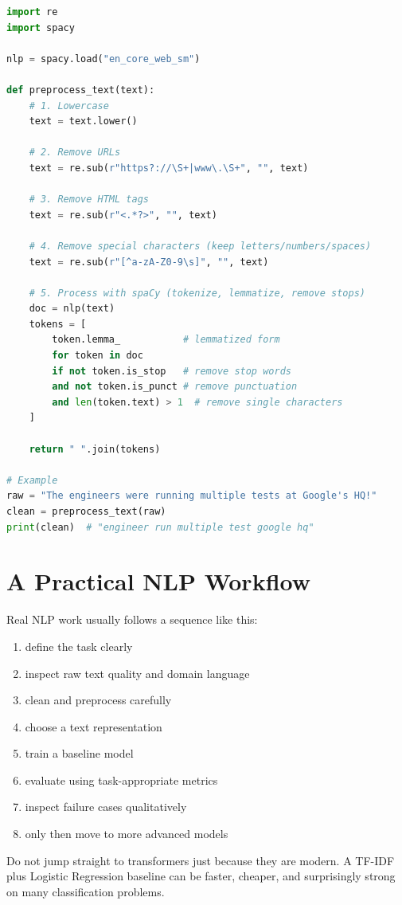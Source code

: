 \documentclass[12pt, a4paper, oneside]{book}
\begin{document}
\begin{lstlisting}[language=Python, caption={Complete NLP preprocessing pipeline}]
import re
import spacy

nlp = spacy.load("en_core_web_sm")

def preprocess_text(text):
    # 1. Lowercase
    text = text.lower()

    # 2. Remove URLs
    text = re.sub(r"https?://\S+|www\.\S+", "", text)

    # 3. Remove HTML tags
    text = re.sub(r"<.*?>", "", text)

    # 4. Remove special characters (keep letters/numbers/spaces)
    text = re.sub(r"[^a-zA-Z0-9\s]", "", text)

    # 5. Process with spaCy (tokenize, lemmatize, remove stops)
    doc = nlp(text)
    tokens = [
        token.lemma_           # lemmatized form
        for token in doc
        if not token.is_stop   # remove stop words
        and not token.is_punct # remove punctuation
        and len(token.text) > 1  # remove single characters
    ]

    return " ".join(tokens)

# Example
raw = "The engineers were running multiple tests at Google's HQ!"
clean = preprocess_text(raw)
print(clean)  # "engineer run multiple test google hq"
\end{lstlisting}

\section{A Practical NLP Workflow}

Real NLP work usually follows a sequence like this:
\begin{enumerate}[leftmargin=2em]
    \item define the task clearly
    \item inspect raw text quality and domain language
    \item clean and preprocess carefully
    \item choose a text representation
    \item train a baseline model
    \item evaluate using task-appropriate metrics
    \item inspect failure cases qualitatively
    \item only then move to more advanced models
\end{enumerate}

\begin{warningbox}
Do not jump straight to transformers just because they are modern. A TF-IDF plus Logistic Regression baseline can be faster, cheaper, and surprisingly strong on many classification problems.
\end{warningbox}
\end{document}
